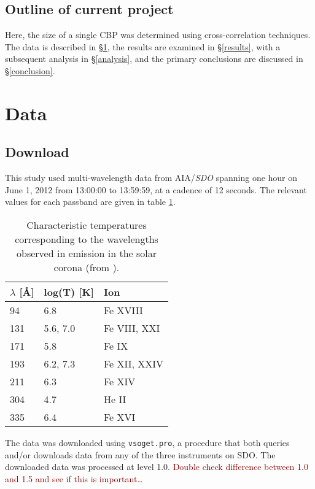 \documentclass[preprint]{aastex}   %
\begin{document}
\subsection{Outline of current project}
Here, the size of a single CBP was determined using cross-correlation techniques.
The data is described in \S{}\ref{data},
the results are examined in \S{}\ref{results},
with a subsequent analysis in \S{}\ref{analysis},
and the primary conclusions are discussed in \S{}\ref{conclusion}.


\section{Data}\label{data}

\subsection{Download}
This study used
multi-wavelength data from AIA/\textit{SDO}
spanning one hour on June 1, 2012 from 13:00:00 to 13:59:59, at a cadence of 12
seconds.
The relevant values for each passband are given in table \ref{temps}.

\begin{table}[h]
\centering
    \begin{tabular}{l l l}
        \hline\hline
        $\lambda$ [\AA{}] & log(T) [K] & Ion \\
        \hline
        94 & 6.8 & Fe {\small XVIII} \\
        131 & 5.6, 7.0 & Fe {\small VIII, XXI} \\
        171 & 5.8 & Fe {\small IX} \\
        193 & 6.2, 7.3 & Fe {\small XII, XXIV} \\
        211 & 6.3 & Fe {\small XIV} \\
        304 & 4.7 & He {\small II} \\
        335 & 6.4 & Fe {\small XVI} \\
    \end{tabular}
\caption{Characteristic temperatures corresponding to the wavelengths observed
    in emission in the solar corona (from \cite{Lemen}).}
\label{temps}
\end{table}

The data was downloaded using \verb|vsoget.pro|, a procedure that
both queries and/or downloads data from any of the three instruments on SDO.
The downloaded data was processed at level 1.0.
\textcolor{darkred}{Double check difference between 1.0 and 1.5 and see if this
is important\ldots}
\end{document}
